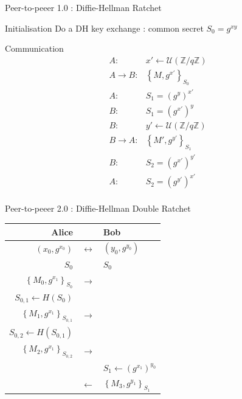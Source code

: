 \documentclass{beamer}
\newcommand{\ZZ}{\mathbb{Z}}
\newcommand{\Uu}{\mathcal{U}}
\newcommand{\la}{\leftarrow}
\newcommand{\ra}{\rightarrow}
\newcommand{\Lla}{\longleftarrow}
\newcommand{\Lra}{\longrightarrow}
\newcommand{\Llra}{\longleftrightarrow}
\newcommand{\set}[1]{\left\{ #1 \right\}}
\begin{document}
\begin{frame}{Peer-to-peeer 1.0 : Diffie-Hellman Ratchet}
	\begin{block}{Initialisation}
		Do a DH key exchange : common secret $S_0 = g^{xy}$
	\end{block}

	\begin{block}{Communication}
	$$
      \begin{array}{rl}
        A :                         & x' \la \Uu(\ZZ / q\ZZ) \\
        A \ra B :                   & \set{M, g^{x'}}_{S_0} \\
        A :                         & S_1 = (g^y)^{x'} \\
        B :                         & S_1 = (g^{x'})^y \\
        B :                         & y' \la \Uu(\ZZ / q \ZZ) \\
        B \ra A :                   & \set{M', g^{y'}}_{S_1} \\
        B :                         & S_2 = (g^{x'})^{y'} \\
        A :                         & S_2 = (g^{y'})^{x'} \\
      \end{array}
      $$
	\end{block}
\end{frame}

\begin{frame}{Peer-to-peeer 2.0 : Diffie-Hellman Double Ratchet}
	\center
	\begin{tabular}{rcl}
		Alice                           &         & Bob \\
		\hline
    $(x_0, g^{x_0})$                & $\Llra$ & $(y_0, g^{y_0})$ \\
		\hline
		$S_0$                           &         & $S_0$ \\
		\hline
		$\set{M_0, g^{x_1}}_{S_0}$      & $\Lra$  & \\
		\hline
		$S_{0, 1} \la H(S_0)$           &         & \\
		\hline
		$\set{M_1, g^{x_1}}_{S_{0, 1}}$ & $\Lra$  & \\
		\hline
		$S_{0, 2} \la H(S_{0, 1})$      &         & \\
		\hline
		$\set{M_2, g^{x_1}}_{S_{0, 2}}$ & $\Lra$  & \\
		\hline
		                                &         & $S_1 \la (g^{x_1})^{y_0}$ \\
		\hline
		                                & $\Lla$  & $\set{M_3, g^{y_1}}_{S_1}$
	\end{tabular}
\end{frame}
\end{document}
